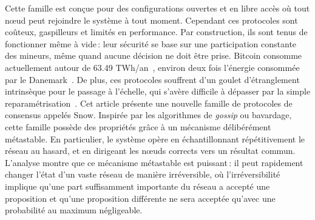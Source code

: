 \documentclass[letterpaper,twocolumn,10pt]{article}
\theoremstyle{definition}
\begin{document}
Cette famille est conçue pour des configurations ouvertes et en libre accès où tout nœud peut rejoindre le système à tout moment.
Cependant ces protocoles sont coûteux, gaspilleurs et limités en performance.
Par construction, ils sont tenus de fonctionner même à vide\,: leur sécurité se base sur une participation constante des mineurs, même quand aucune décision ne doit être prise.
Bitcoin consomme actuellement autour de 63.49 TWh/an~\cite{bitcoinpower}, environ deux fois l'énergie consommée par le Danemark~\cite{denmarkpower}.
De plus, ces protocoles souffrent d'un goulet d'étranglement intrinsèque pour le passage à l'échelle, qui s'avère difficile à dépasser par la simple reparamétrisation~\cite{CromanDEGJKMSSS16}.
Cet article présente une nouvelle famille de protocoles de consensus appelés Snow.
Inspirée par les algorithmes de \emph{gossip} ou bavardage, cette famille possède des propriétés grâce à un mécanisme délibérément métastable.
En particulier, le système opère en échantillonnant répétitivement le réseau au hasard, et en dirigeant les nœuds corrects vers un résultat commun.
L'analyse montre que ce mécanisme métastable est puissant\,: il peut rapidement changer l'état d'un vaste réseau de manière irréversible, où l'irréversibilité implique qu'une part suffisamment importante du réseau a accepté une proposition et qu'une proposition différente ne sera acceptée qu'avec une probabilité au maximum négligeable.
\end{document}
